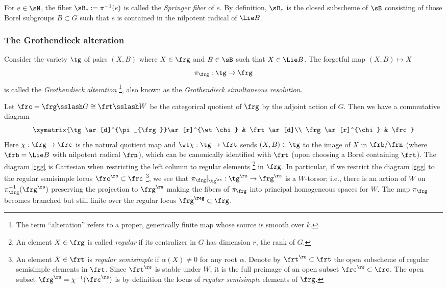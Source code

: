 For $e\in\sN$, the fiber $\sB_{e}:=\pi^{-1}(e)$ is called the {\em Springer fiber} of $e$. By definition, $\sB_{e}$ is the closed subscheme of $\sB$ consisting of those Borel subgroups $B\subset G$ such that $e$ is contained in the nilpotent radical of $\Lie B$. 

\subsubsection{The Grothendieck alteration}\label{sss:Gr alt}
Consider the variety $\tg$ of pairs $(X,B)$ where $X\in\frg$ and $B\in\sB$ such that $X\in\Lie B$. The forgetful map $(X,B)\mapsto X$
\begin{equation*}
\pi_{\frg}: \tg\to \frg
\end{equation*}  
is called the {\em Grothendieck alteration} \footnote{The term ``alteration'' refers to a proper, generically finite map whose source is smooth over $k$.}, also known as the {\em Grothendieck simultaneous resolution}. 
 
Let $\frc=\frg\sslash G\cong \frt\sslash W$ be the categorical quotient of $\frg$ by the adjoint action of $G$. Then we have a commutative diagram
\begin{equation}\label{tgg}
\xymatrix{\tg\ar[d]^{\pi_{\frg}}\ar[r]^{\wt\chi} & \frt\ar[d]\\
\frg \ar[r]^{\chi} & \frc}
\end{equation}
Here $\chi:\frg\to \frc$ is the natural quotient map and $\wt\chi:\tg\to \frt$ sends $(X,B)\in\tg$ to the image of $X$ in $\frb/\frn$ (where $\frb=\Lie B$ with nilpotent radical $\frn$), which can be canonically identified with $\frt$ (upon choosing a Borel containing $\frt$). The diagram \eqref{tgg} is Cartesian when restricting the left column to regular elements  \footnote{An element $X\in\frg$ is called {\em regular} if its centralizer in $G$ has dimension $r$, the rank of $G$.} in $\frg$. In particular, if we restrict the diagram \eqref{tgg} to the regular semisimple locus $\frc^{\rs}\subset \frc$   \footnote{An element $X\in\frt$ is {\em regular semisimple} if $\alpha(X)\neq0$ for any root $\alpha$. Denote by $\frt^{\rs}\subset\frt$ the open subscheme of regular semisimple elements in $\frt$. Since $\frt^{\rs}$ is stable under $W$, it is the full preimage of an open subset $\frc^{\rs}\subset\frc$. The open subset $\frg^{\rs}=\chi^{-1}(\frc^{\rs})$ is by definition the locus of {\em regular semisimple} elements of $\frg$.}, we see that $\pi_{\frg}|_{\tg^{\rs}}:\tg^{\rs}\to \frg^{\rs}$ is a $W$-torsor; i.e., there is an action of $W$ on $\pi_{\frg}^{-1}(\frg^{\rs})$ preserving the projection to $\frg^{\rs}$ making the fibers of $\pi_{\frg}$ into principal homogeneous spaces for $W$. The map $\pi_{\frg}$ becomes branched but still finite over the regular locus $\frg^{\reg}\subset \frg$.


